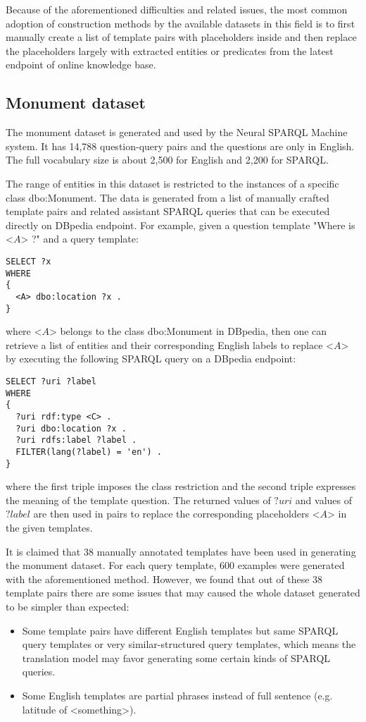 Because of the aforementioned difficulties and related issues, the most common adoption of construction methods by the available datasets in this field is to first manually create a list of template pairs with placeholders inside and then replace the placeholders largely with extracted entities or predicates from the latest endpoint of online knowledge base.

\subsection{Monument dataset} \label{subsection:monument dataset}

The monument dataset is generated and used by the Neural SPARQL Machine \cite{Soru2018a} system. It has 14,788 question-query pairs and the questions are only in English. The full vocabulary size is about 2,500 for English and 2,200 for SPARQL.

The range of entities in this dataset is restricted to the instances of a specific class dbo:Monument. The data is generated from a list of manually crafted template pairs and related assistant SPARQL queries that can be executed directly on DBpedia endpoint. For example, given a question template "Where is <$ A $> ?" and a query template:
\begin{lstlisting}[language=SPARQL]
SELECT ?x
WHERE
{ 
  <A> dbo:location ?x . 
}
\end{lstlisting}
where <$ A $> belongs to the class dbo:Monument in DBpedia, then one can retrieve a list of entities and their corresponding English labels to replace <$ A $> by executing the following SPARQL query on a DBpedia endpoint:
\begin{lstlisting}[language=SPARQL]
SELECT ?uri ?label
WHERE
{ 
  ?uri rdf:type <C> .
  ?uri dbo:location ?x . 
  ?uri rdfs:label ?label .
  FILTER(lang(?label) = 'en') .
}
\end{lstlisting}
where the first triple imposes the class restriction and the second triple expresses the meaning of the template question. The returned values of $ ?uri $ and values of $ ?label $ are then used in pairs to replace the corresponding placeholders <$ A $> in the given templates.

It is claimed that \cite{Soru2018a} 38 manually annotated templates have been used in generating the monument dataset. For each query template, 600 examples were generated with the aforementioned method. However, we found that out of these 38 template pairs there are some issues that may caused the whole dataset generated to be simpler than expected:
\begin{itemize}
\item Some template pairs have different English templates but same SPARQL query templates or very similar-structured query templates, which means the translation model may favor generating some certain kinds of SPARQL queries.
\item Some English templates are partial phrases instead of full sentence (e.g. latitude of <something>).
\end{itemize}

